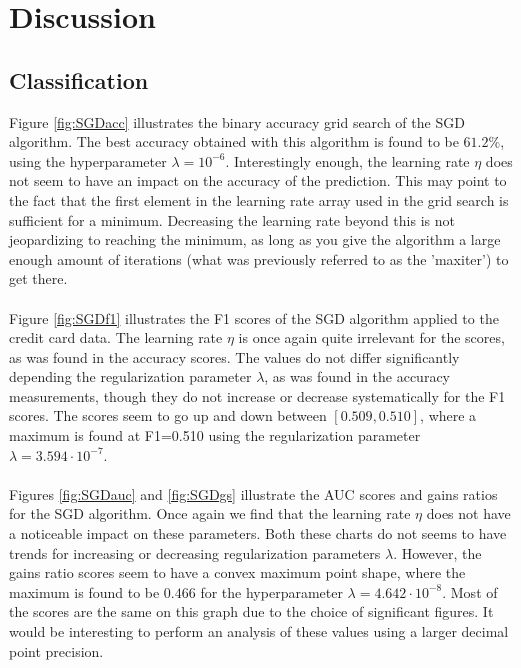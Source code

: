 \section{Discussion}
    \subsection{Classification}
        Figure \ref{fig:SGDacc} illustrates the binary accuracy grid search of the SGD algorithm. The best accuracy obtained with this algorithm is found to be $61.2\%$, using the hyperparameter $\lambda = 10^{-6}$. Interestingly enough, the learning rate $\eta$ does not seem to have an impact on the accuracy of the prediction. This may point to the fact that the first element in the learning rate array used in the grid search is sufficient for a minimum. Decreasing the learning rate beyond this is not jeopardizing to reaching the minimum, as long as you give the algorithm a large enough amount of iterations (what was previously referred to as the 'maxiter') to get there.\\\\
        Figure \ref{fig:SGDf1} illustrates the F1 scores of the SGD algorithm applied to the credit card data. The learning rate $\eta$ is once again quite irrelevant for the scores, as was found in the accuracy scores. The values do not differ significantly depending the regularization parameter $\lambda$, as was found in the accuracy measurements, though they do not increase or decrease systematically for the F1 scores. The scores seem to go up and down between $[0.509, 0.510]$, where a maximum is found at F1=0.510 using the regularization parameter $\lambda=3.594\cdot10^{-7}$.\\\\
        Figures \ref{fig:SGDauc} and \ref{fig:SGDgs} illustrate the AUC scores and gains ratios for the SGD algorithm. Once again we find that the learning rate $\eta$ does not have a noticeable impact on these parameters. Both these charts do not seems to have trends for increasing or decreasing regularization parameters $\lambda$. However, the gains ratio scores seem to have a convex maximum point shape, where the maximum is found to be $0.466$ for the hyperparameter $\lambda=4.642\cdot 10^{-8}$. Most of the scores are the same on this graph due to the choice of significant figures. It would be interesting to perform an analysis of these values using a larger decimal point precision.\\\\
